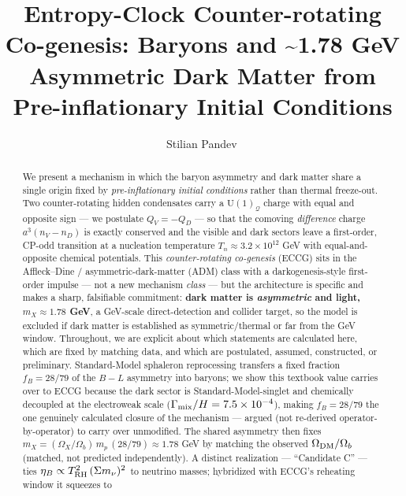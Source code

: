 \documentclass[aps,prd,preprint,nofootinbib,superscriptaddress]{revtex4-2}
\begin{document}
\title{Entropy-Clock Counter-rotating Co-genesis: Baryons and
\textasciitilde1.78 GeV Asymmetric Dark Matter from Pre-inflationary
Initial Conditions}

\author{Stilian Pandev\,}

\begin{abstract}
We present a mechanism in which the baryon asymmetry and dark matter
share a single origin fixed by \emph{pre-inflationary initial
conditions} rather than thermal freeze-out. Two counter-rotating hidden
condensates carry a \(\mathrm{U}(1)_{\mathcal{Q}}\) charge with equal
and opposite sign --- we postulate \(Q_V = -Q_D\) --- so that the
comoving \emph{difference} charge \(a^{3}(n_V - n_D)\) is exactly
conserved and the visible and dark sectors leave a first-order, CP-odd
transition at a nucleation temperature \(T_n \approx 3.2\times10^{12}\)
GeV with equal-and-opposite chemical potentials. This
\emph{counter-rotating co-genesis} (ECCG) sits in the Affleck--Dine /
asymmetric-dark-matter (ADM) class
\citep{Kaplan:2009ag, Petraki:2013wwa, Zurek:2013wia, Cheung:2011if}
with a darkogenesis-style first-order impulse
\citep{Shelton:2010ta, Hall:2019rld} --- not a new mechanism
\emph{class} --- but the architecture is specific and makes a sharp,
falsifiable commitment: \textbf{dark matter is \emph{asymmetric} and
light, \(m_X \approx 1.78\) GeV}, a GeV-scale direct-detection and
collider target, so the model is excluded if dark matter is established
as symmetric/thermal or far from the GeV window. Throughout, we are
explicit about which statements are calculated here, which are fixed by
matching data, and which are postulated, assumed, constructed, or
preliminary. Standard-Model sphaleron reprocessing transfers a fixed
fraction \(f_B = 28/79\) \citep{Harvey:1990qw} of the \(B{-}L\)
asymmetry into baryons; we show this textbook value carries over to ECCG
because the dark sector is Standard-Model-singlet and chemically
decoupled at the electroweak scale
(\(\Gamma_{\rm mix}/H = 7.5\times10^{-4}\)), making \(f_B = 28/79\) the
one genuinely calculated closure of the mechanism --- argued (not
re-derived operator-by-operator) to carry over unmodified. The shared
asymmetry then fixes
\(m_X = (\Omega_X/\Omega_b)\, m_p\,(28/79) \approx 1.78\) GeV by
matching the observed \(\Omega_{\rm DM}/\Omega_b\) (matched, not
predicted independently). A distinct realization --- ``Candidate C'' ---
ties \(\eta_B \propto T_{\rm RH}^{2}\,(\Sigma m_\nu)^{2}\) to neutrino
masses; hybridized with ECCG's reheating window it squeezes to

\end{abstract}
\end{document}
